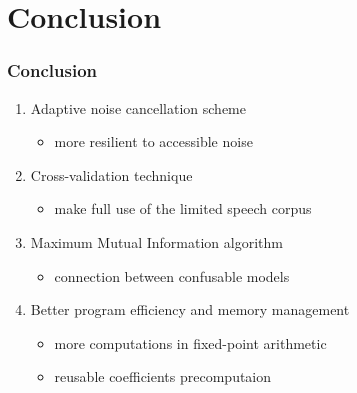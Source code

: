 \section{Conclusion}

\begin{frame}
\frametitle{Conclusion}

\begin{enumerate}
	\item Adaptive noise cancellation scheme
	\begin{itemize}
		\item more resilient to accessible noise
	\end{itemize}
	\item Cross-validation technique
	\begin{itemize}
		\item make full use of the limited speech corpus
	\end{itemize}
	\item Maximum Mutual Information algorithm
	\begin{itemize}
		\item connection between confusable models
	\end{itemize}
	\item Better program efficiency and memory management
	\begin{itemize}
		\item more computations in fixed-point arithmetic
		\item reusable coefficients precomputaion
	\end{itemize}
\end{enumerate}
\end{frame}
